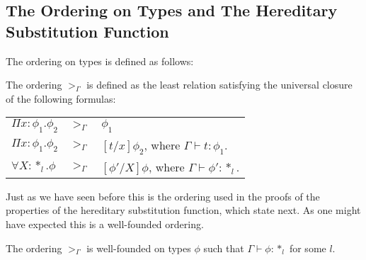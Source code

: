 \subsection{The Ordering on Types and The Hereditary Substitution Function}
\label{sec:the_hereditary_substitution_function_ssfe}
The ordering on types is defined as follows:
\begin{definition}
  The ordering $>_\Gamma$ is defined as the least relation satisfying the universal closure
  of the following formulas:
  \begin{center}
    \begin{tabular}{lll}
      $\Pi x:\phi_1.\phi_2$ & $>_\Gamma$ & $\phi_1$\\
      $\Pi x:\phi_1.\phi_2$ & $>_{\Gamma}$ & $[t/x]\phi_2$, where $\Gamma \vdash t:\phi_1$.\\
      $\forall X:*_l.\phi$  & $>_\Gamma$ & $[\phi'/X]\phi$, where $\Gamma \vdash \phi':*_l$.\\
    \end{tabular}
  \end{center}
  \label{def:ordering_ssfe}
\end{definition}
Just as we have seen before this is the ordering used in the proofs of
the properties of the hereditary substitution function, which state
next.  As one might have expected this is a well-founded ordering.
\begin{thm}
  The ordering $>_\Gamma$ is well-founded on types $\phi$ such that 
  $\Gamma \vdash \phi:*_l$ for some $l$.
  \label{thm:well-founded_ordering_ssfe}
\end{thm}
